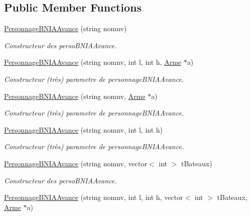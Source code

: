 \subsection*{Public Member Functions}
\begin{DoxyCompactItemize}
\item 
\hyperlink{classPersonnageBNIAAvance_a7d76f599d0e2f9aa12fe83e39376ec20}{Personnage\-B\-N\-I\-A\-Avance} (string nomnv)
\begin{DoxyCompactList}\small\item\em Constructeur des perso\-B\-N\-I\-A\-Avance. \end{DoxyCompactList}\item 
\hyperlink{classPersonnageBNIAAvance_a212d98b1b63d76ca0e16e3774a2787f8}{Personnage\-B\-N\-I\-A\-Avance} (string nomnv, int l, int h, \hyperlink{classArme}{Arme} $\ast$a)
\begin{DoxyCompactList}\small\item\em Constructeur (très) parametre de personnage\-B\-N\-I\-A\-Avance. \end{DoxyCompactList}\item 
\hyperlink{classPersonnageBNIAAvance_a8ec6b979b9154f6394e0e9c18c31c7cc}{Personnage\-B\-N\-I\-A\-Avance} (string nomnv, \hyperlink{classArme}{Arme} $\ast$a)
\begin{DoxyCompactList}\small\item\em Constructeur (très) parametre de personnage\-B\-N\-I\-A\-Avance. \end{DoxyCompactList}\item 
\hyperlink{classPersonnageBNIAAvance_aff9e64c9f9acc22463267487b8f12358}{Personnage\-B\-N\-I\-A\-Avance} (string nomnv, int l, int h)
\begin{DoxyCompactList}\small\item\em Constructeur (très) parametre de personnage\-B\-N\-I\-A\-Avance. \end{DoxyCompactList}\item 
\hyperlink{classPersonnageBNIAAvance_a789de7bfcd57dbff0675dd91f548bbab}{Personnage\-B\-N\-I\-A\-Avance} (string nomnv, vector$<$ int $>$ t\-Bateaux)
\begin{DoxyCompactList}\small\item\em Constructeur des perso\-B\-N\-I\-A\-Avance. \end{DoxyCompactList}\item 
\hyperlink{classPersonnageBNIAAvance_a50fad41761a1f1d36269cf264781ebe0}{Personnage\-B\-N\-I\-A\-Avance} (string nomnv, int l, int h, vector$<$ int $>$ t\-Bateaux, \hyperlink{classArme}{Arme} $\ast$a)

\end{DoxyCompactItemize}
